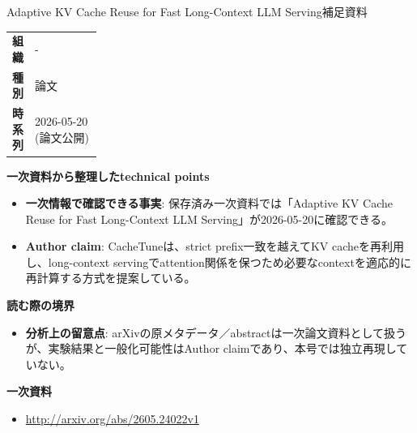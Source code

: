 \begin{technicalnote}{Adaptive KV Cache Reuse for Fast Long-Context LLM Serving}{補足資料}
\begingroup
\begin{tabularx}{\linewidth}{@{}>{\bfseries}p{0.22\linewidth}X@{}}
組織 & - \\
種別 & 論文 \\
時系列 & 2026-05-20 (論文公開) \\
\end{tabularx}
\smallskip
{\bfseries 一次資料から整理したtechnical points}
\begin{itemize}[leftmargin=1.5em,itemsep=0.35em]
\item \textbf{一次情報で確認できる事実}: 保存済み一次資料では「Adaptive KV Cache Reuse for Fast Long-Context LLM Serving」が2026-05-20に確認できる。
\end{itemize}
\begin{minipage}{\linewidth}
\begin{itemize}[leftmargin=1.5em,itemsep=0.35em]
\item \textbf{Author claim}: CacheTuneは、strict prefix一致を越えてKV cacheを再利用し、long-context servingでattention関係を保つため必要なcontextを適応的に再計算する方式を提案している。
\end{itemize}
{\bfseries 読む際の境界}
\begin{itemize}[leftmargin=1.5em,itemsep=0.35em]
\item \textbf{分析上の留意点}: arXivの原メタデータ／abstractは一次論文資料として扱うが、実験結果と一般化可能性はAuthor claimであり、本号では独立再現していない。
\end{itemize}
\begin{samepage}
{\bfseries 一次資料}
\begingroup\sloppy
\begin{itemize}[leftmargin=1.5em,itemsep=0.25em]
\item {\scriptsize\url{http://arxiv.org/abs/2605.24022v1}}
\end{itemize}
\endgroup
\end{samepage}
\end{minipage}
\endgroup
\end{technicalnote}
\medskip

